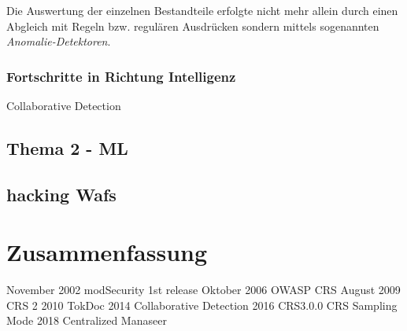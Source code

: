 Die Auswertung der einzelnen Bestandteile erfolgte nicht mehr allein durch einen Abgleich mit Regeln bzw. regulären Ausdrücken sondern mittels sogenannten \emph{Anomalie-Detektoren}. 


\subsubsection{Fortschritte in Richtung Intelligenz}

Collaborative Detection \cite{karakannas2014}


\subsection{Thema 2 - ML}


\subsection{hacking Wafs}


\section{Zusammenfassung}



November 2002 modSecurity 1st release
Oktober 2006 OWASP CRS
August 2009 CRS 2
2010 TokDoc
2014 Collaborative Detection
2016 CRS3.0.0 CRS Sampling Mode
2018 Centralized Manaseer